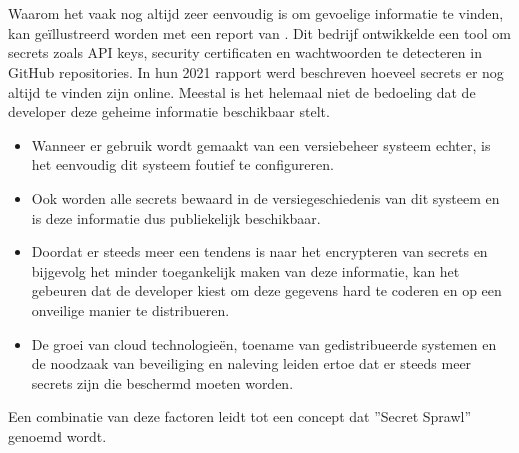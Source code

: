 \section{}%
\label{sec:Kwetsbaarheden en aanvallen om secrets te extraheren}

\subsection{}
\label{sec:Secret Sprawl}
Waarom het vaak nog altijd zeer eenvoudig is om gevoelige informatie te vinden, kan geïllustreerd worden met een report van \Textcite{GitGuardian2021}. Dit bedrijf ontwikkelde een tool om secrets zoals API keys, security certificaten en wachtwoorden te detecteren in GitHub repositories. In hun 2021 rapport werd beschreven hoeveel secrets er nog altijd te vinden zijn online. Meestal is het helemaal niet de bedoeling dat de developer deze geheime informatie beschikbaar stelt.

\begin{itemize}
  \item Wanneer er gebruik wordt gemaakt van een versiebeheer systeem echter, is het eenvoudig dit systeem foutief te configureren.
  \item Ook worden alle secrets bewaard in de versiegeschiedenis van dit systeem en is deze informatie dus publiekelijk beschikbaar.
  \item Doordat er steeds meer een tendens is naar het encrypteren van secrets en bijgevolg het minder toegankelijk maken van deze informatie, kan het gebeuren dat de developer kiest om deze gegevens hard te coderen en op een onveilige manier te distribueren.
  \item  De groei van cloud technologieën, toename van gedistribueerde systemen en de noodzaak van beveiliging en naleving leiden ertoe dat er steeds meer secrets zijn die beschermd moeten worden.
\end{itemize}
Een combinatie van deze factoren leidt tot een concept dat ''Secret Sprawl'' genoemd wordt. \autocite{GitGuardian2021}
\clearpage


